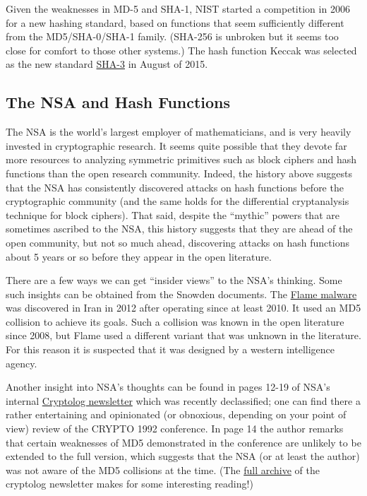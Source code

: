 Given the weaknesses in MD-5 and SHA-1, NIST started a competition in
2006 for a new hashing standard, based on functions that seem
sufficiently different from the MD5/SHA-0/SHA-1 family. (SHA-256 is
unbroken but it seems too close for comfort to those other systems.) The
hash function Keccak was selected as the new standard
\href{https://goo.gl/Bx1bu2}{SHA-3} in August of 2015.

\subsection{The NSA and Hash Functions}\label{7-The-NSA-and-Hash-Funct}

The NSA is the world's largest employer of mathematicians, and is very
heavily invested in cryptographic research. It seems quite possible that
they devote far more resources to analyzing symmetric primitives such as
block ciphers and hash functions than the open research community.
Indeed, the history above suggests that the NSA has consistently
discovered attacks on hash functions before the cryptographic community
(and the same holds for the differential cryptanalysis technique for
block ciphers). That said, despite the ``mythic'' powers that are
sometimes ascribed to the NSA, this history suggests that they are ahead
of the open community, but not so much ahead, discovering attacks on
hash functions about 5 years or so before they appear in the open
literature.

There are a few ways we can get ``insider views'' to the NSA's thinking.
Some such insights can be obtained from the Snowden documents. The
\href{https://en.wikipedia.org/wiki/Flame_(malware)}{Flame malware} was
discovered in Iran in 2012 after operating since at least 2010. It used
an MD5 collision to achieve its goals. Such a collision was known in the
open literature since 2008, but Flame used a different variant that was
unknown in the literature. For this reason it is suspected that it was
designed by a western intelligence agency.

Another insight into NSA's thoughts can be found in pages 12-19 of NSA's
internal
\href{https://cryptome.org/2013/03/cryptologs/cryptolog_126.pdf}{Cryptolog
newsletter} which was recently declassified; one can find there a rather
entertaining and opinionated (or obnoxious, depending on your point of
view) review of the CRYPTO 1992 conference. In page 14 the author
remarks that certain weaknesses of MD5 demonstrated in the conference
are unlikely to be extended to the full version, which suggests that the
NSA (or at least the author) was not aware of the MD5 collisions at the
time. (The
\href{https://cryptome.org/2013/03/cryptologs/00-cryptolog-index.htm}{full
archive} of the cryptolog newsletter makes for some interesting
reading!)


